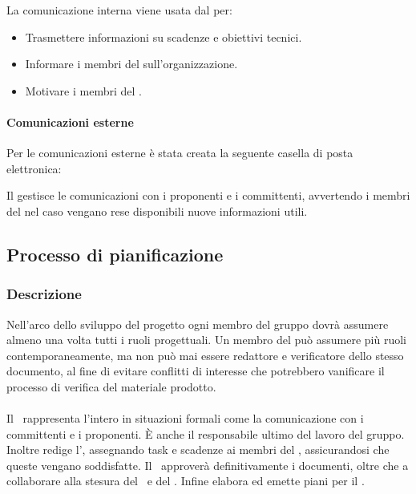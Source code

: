 La comunicazione interna viene usata dal  per:
\begin{itemize}
\item
Trasmettere informazioni su scadenze e obiettivi tecnici.
\item
Informare i membri del  sull'organizzazione.
\item
Motivare i membri del .
\end{itemize}

\paragraph{Comunicazioni esterne}
Per le comunicazioni esterne è stata creata la seguente casella di posta elettronica:

\begin{center} \email \end{center}

Il \Pm gestisce le comunicazioni con i proponenti e i committenti, avvertendo i membri del  nel caso vengano rese disponibili nuove informazioni utili.


\subsection{Processo di pianificazione}
\subsubsection{Descrizione}
Nell'arco dello sviluppo del progetto ogni membro del gruppo dovrà assumere almeno una volta tutti i ruoli progettuali.
Un membro del  può assumere più ruoli contemporaneamente, ma non può mai essere redattore e verificatore dello stesso documento, al fine di evitare conflitti di interesse che potrebbero vanificare il processo di verifica del materiale prodotto.

\paragraph{\Pm}
Il \Pm\ rappresenta l'intero  in situazioni formali come la comunicazione con i committenti e i proponenti. È anche il responsabile ultimo del lavoro del gruppo. Inoltre redige l', assegnando task e scadenze ai membri del , assicurandosi che queste vengano soddisfatte. 
Il \Pm\ approverà definitivamente i documenti, oltre che a collaborare alla stesura del \PdP\  e del \PdQ.
Infine elabora ed emette piani per il .

